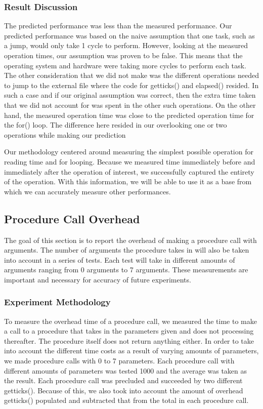 \documentclass{article} %
\begin{document}
\subsubsection{Result Discussion}

The predicted performance was less than the measured performance. Our predicted performance was based on the naive assumption that one task, such as a jump, would only take 1 cycle to perform. However, looking at the measured operation times, our assumption was proven to be false. This means that the operating system and hardware were taking more cycles to perform each task. The other consideration that we did not make was the different operations needed to jump to the external file where the code for getticks() and elapsed() resided. In such a case and if our original assumption was correct, then the extra time taken that we did not account for was spent in the other such operations. On the other hand, the measured operation time was close to the predicted operation time for the for() loop. The difference here resided in our overlooking one or two operations while making our prediction

Our methodology centered around measuring the simplest possible operation for reading time and for looping. Because we measured time immediately before and immediately after the operation of interest, we successfully captured the entirety of the operation. With this information, we will be able to use it as a base from which we can accurately measure other performances.

\subsection{Procedure Call Overhead}
The goal of this section is to report the overhead of making a procedure call with arguments. The number of arguments the procedure takes in will also be taken into account in a series of tests. Each test will take in different amounts of arguments ranging from 0 arguments to 7 arguments. These measurements are important and necessary for accuracy of future experiments.

\subsubsection{Experiment Methodology}
To measure the overhead time of a procedure call, we measured the time to make a call to a procedure that takes in the parameters given and does not processing thereafter. The procedure itself does not return anything either. In order to take into account the different time costs as a result of varying amounts of parameters, we made procedure calls with 0 to 7 parameters. Each procedure call with different amounts of parameters was tested 1000 and the average was taken as the result. Each procedure call was precluded and succeeded by two different getticks(). Because of this, we also took into account the amount of overhead getticks() populated and subtracted that from the total in each procedure call. 
\end{document}
